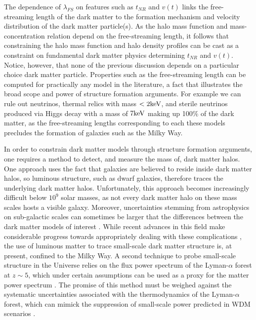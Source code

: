 The dependence of $\lambda_{FS}$ on features such as $t_{NR}$ and $v\left(t\right)$ links the free-streaming length of the dark matter to the formation mechanism and velocity distribution of the dark matter particle(s). As the halo mass function and mass-concentration relation depend on the free-streaming length, it follows that constraining the halo mass function and halo density profiles can be cast as a constraint on fundamental dark matter physics determining $t_{NR}$ and $v\left(t\right)$. Notice, however, that none of the previous discussion depends on a particular choice dark matter particle. Properties such as the free-streaming length can be computed for practically any model in the literature, a fact that illustrates the broad scope and power of structure formation arguments. For example we can rule out neutrinos, thermal relics with mass $< 2 \rm{keV}$, and sterile neutrinos produced via Higgs decay with a mass of $7 \rm{keV}$ \citep{Viel13,AbazaijanKusenko19} making up 100$\%$ of the dark matter, as the free-streaming lengths corresponding to each these models precludes the formation of galaxies such as the Milky Way. 

In order to constrain dark matter models through structure formation arguments, one requires a method to detect, and measure the mass of, dark matter halos. One approach uses the fact that galaxies are believed to reside inside dark matter halos, so luminous structure, such as dwarf galaxies, therefore traces the underlying dark matter halos. Unfortunately, this approach becomes increasingly difficult below $10^9$ solar masses, as not every dark matter halo on these mass scales hosts a visible galaxy. Moreover, uncertainties stemming from astrophysics on sub-galactic scales can sometimes be larger that the differences between the dark matter models of interest \citep{Nierenberg++16}. While recent advances in this field make considerable progress towards appropriately dealing with these complications \citep{Nadler++19}, the use of luminous matter to trace small-scale dark matter structure is, at present, confined to the Milky Way. A second technique to probe small-scale structure in the Universe relies on the flux power spectrum of the Lyman-$\alpha$ forest at $z \sim 5$, which under certain assumptions can be used as a proxy for the matter power spectrum \citep{Viel13,Irsic++17}. The promise of this method must be weighed against the systematic uncertainties associated with the thermodynamics of the Lyman-$\alpha$ forest, which can mimick the suppression of small-scale power predicted in WDM scenarios \citep{Garzilli++19}. 

